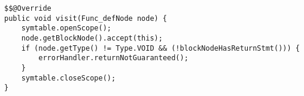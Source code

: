 \begin{lstlisting}[caption={If there is no return statement in the current scope, or an if else block where return is guaranteed throw an error.}, label={code:MISRE:funcdef}]
$$@Override
public void visit(Func_defNode node) {
    symtable.openScope();
    node.getBlockNode().accept(this);
    if (node.getType() != Type.VOID && (!blockNodeHasReturnStmt())) {
        errorHandler.returnNotGuaranteed();
    }
    symtable.closeScope();
}
\end{lstlisting}